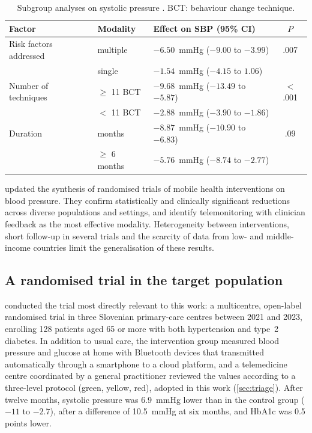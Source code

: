 \begin{table}[htbp]
\centering\small
\caption{Subgroup analyses on systolic pressure \parencite{zhou2024}. BCT: behaviour change technique.}\label{tab:subgroups}
\begin{tabularx}{\textwidth}{@{}>{\raggedright\arraybackslash}p{3.3cm} >{\raggedright\arraybackslash}p{2.5cm} X c@{}}
\toprule
\textbf{Factor} & \textbf{Modality} & \textbf{Effect on SBP (95\% CI)} & \textbf{$P$} \\
\midrule
Risk factors addressed & multiple & $-6.50$~mmHg ($-9.00$ to $-3.99$) & .007 \\
                       & single   & $-1.54$~mmHg ($-4.15$ to $1.06$) & \\
\addlinespace
Number of techniques & $\geq$ 11 BCT & $-9.68$~mmHg ($-13.49$ to $-5.87$) & $<$.001 \\
                     & $<$ 11 BCT    & $-2.88$~mmHg ($-3.90$ to $-1.86$) & \\
\addlinespace
Duration & 3 months & $-8.87$~mmHg ($-10.90$ to $-6.83$) & .09 \\
         & $\geq$ 6 months & $-5.76$~mmHg ($-8.74$ to $-2.77$) & \\
\bottomrule
\end{tabularx}
\end{table}

\Textcite{bandeira2024} updated the synthesis of randomised trials of mobile health interventions on blood pressure. They confirm statistically and clinically significant reductions across diverse populations and settings, and identify telemonitoring with clinician feedback as the most effective modality. Heterogeneity between interventions, short follow-up in several trials and the scarcity of data from low- and middle-income countries limit the generalisation of these results.

\subsection{A randomised trial in the target population}\label{sec:mihevc}

\Textcite{mihevc2025} conducted the trial most directly relevant to this work: a multicentre, open-label randomised trial in three Slovenian primary-care centres between 2021 and 2023, enrolling 128 patients aged 65 or more with both hypertension and type~2 diabetes. In addition to usual care, the intervention group measured blood pressure and glucose at home with Bluetooth devices that transmitted automatically through a smartphone to a cloud platform, and a telemedicine centre coordinated by a general practitioner reviewed the values according to a three-level protocol (green, yellow, red), adopted in this work (\cref{sec:triage}). After twelve months, systolic pressure was 6.9~mmHg lower than in the control group ($-11$ to $-2.7$), after a difference of 10.5~mmHg at six months, and HbA1c was 0.5 points lower.

